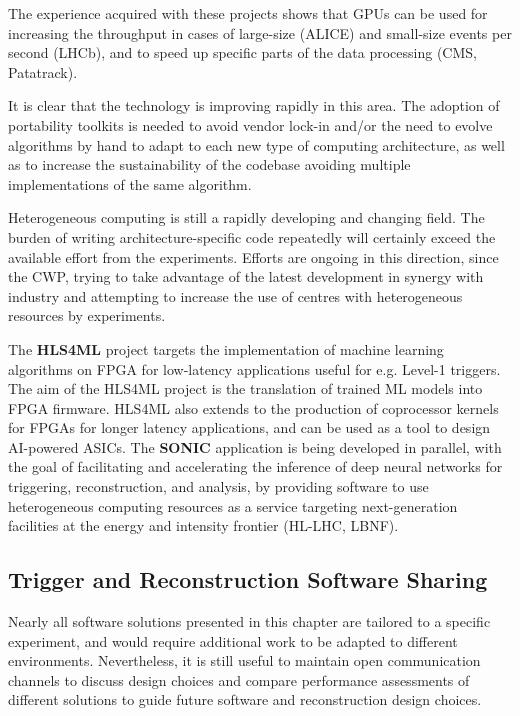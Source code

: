 The experience acquired with these projects shows that GPUs can be used
for increasing the throughput in cases of large-size (ALICE) \cite{david_rohr_2019_3599418} and small-size events per second (LHCb), and to speed up
specific parts of the data processing (CMS, Patatrack).

It is clear that the technology is improving rapidly in this area. The
adoption of portability toolkits is needed to avoid vendor lock-in
and/or the need to evolve algorithms by hand to adapt to each new type
of computing architecture, as well as to increase the sustainability of
the codebase avoiding multiple implementations of the same algorithm.

Heterogeneous computing is still a rapidly developing and changing
field. The burden of writing architecture-specific code repeatedly will
certainly exceed the available effort from the experiments. Efforts are
ongoing in this direction, since the CWP, trying to take advantage of
the latest development in synergy with industry and attempting to
increase the use of centres with heterogeneous resources by experiments.

The \textbf{HLS4ML} project \cite{Duarte:2018ite,Summers:2020xiy,DiGuglielmo:2020eqx} targets the implementation of
machine learning algorithms on FPGA for low-latency applications useful
for e.g. Level-1 triggers. The aim of the HLS4ML project is the
translation of trained ML models into FPGA firmware. HLS4ML also extends
to the production of coprocessor kernels for FPGAs for longer latency
applications, and can be used as a tool to design AI-powered ASICs. The
\textbf{SONIC} application \cite{Duarte:2019fta} is being developed in parallel, with
the goal of facilitating and accelerating the inference of deep neural
networks for triggering, reconstruction, and analysis, by providing
software to use heterogeneous computing resources as a service targeting
next-generation facilities at the energy and intensity frontier (HL-LHC,
LBNF).

\hypertarget{trigger-and-reconstruction-software-sharing}{%
\subsection{Trigger and Reconstruction Software
Sharing}\label{trigger-and-reconstruction-software-sharing}}

Nearly all software solutions presented in this chapter are tailored to
a specific experiment, and would require additional work to be adapted
to different environments. Nevertheless, it is still useful to maintain
open communication channels to discuss design choices and compare
performance assessments of different solutions to guide future software
and reconstruction design choices.

